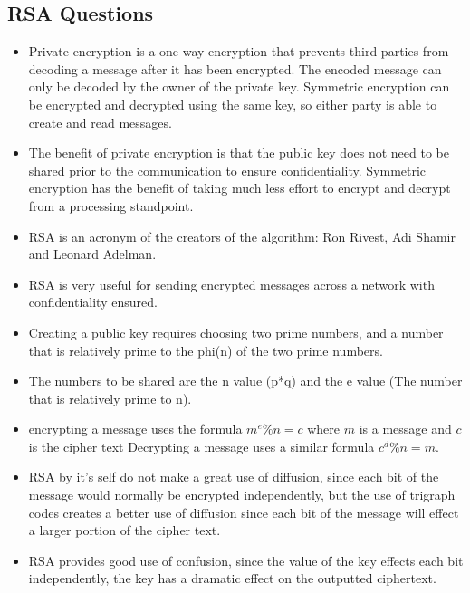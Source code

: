 \documentclass[14pt]{article}
\begin{document}
\subsection{RSA Questions}
\begin{itemize}
  \item Private encryption is a one way encryption that prevents third parties from decoding a message after it has been encrypted. The encoded message can only be decoded by the owner of the private key. Symmetric encryption can be encrypted and decrypted using the same key, so either party is able to create and read messages.
  \item The benefit of private encryption is that the public key does not need to be shared prior to the communication to ensure confidentiality. Symmetric encryption has the benefit of taking much less effort to encrypt and decrypt from a processing standpoint.
  \item RSA is an acronym of the creators of the algorithm: Ron Rivest, Adi Shamir and Leonard Adelman.
  \item RSA is very useful for sending encrypted messages across a network with confidentiality ensured.
  \item Creating a public key requires choosing two prime numbers, and a number that is relatively prime to the phi(n) of the two prime numbers.
  \item The numbers to be shared are the n value (p*q) and the e value (The number that is relatively prime to n).
  \item encrypting a message uses the formula $m^{e} \% n = c$ where $m$ is a message and $c$ is the cipher text
    Decrypting a message uses a similar formula $c^{d} \% n = m$.
  \item RSA by it's self do not make a great use of diffusion, since each bit of the message would normally be encrypted independently, but the use of trigraph codes creates a better use of diffusion since each bit of the message will effect a larger portion of the cipher text.
  \item RSA provides good use of confusion, since the value of the key effects each bit independently, the key has a dramatic effect on the outputted ciphertext.

\end{itemize}

\newpage
\end{document}
